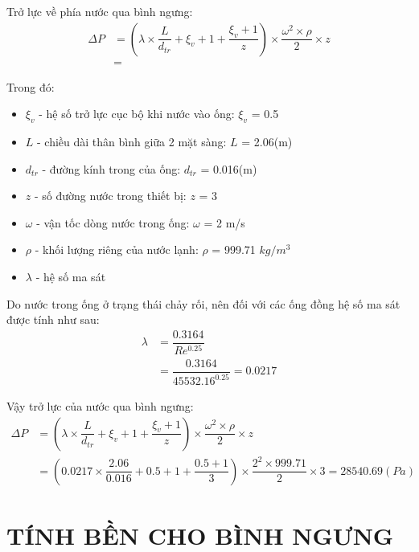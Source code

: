 Trở lực về phía nước qua bình ngưng:
\begin{equation*}
	\begin{split}
		\Delta P &= \left(\lambda\times\dfrac{L}{d_{tr}} +\xi_{v} + 1 + \dfrac{\xi_{v} + 1}{z}\right)\times \dfrac{\omega^2\times\rho}{2}\times z\\
		&=  
	\end{split}
\end{equation*}

Trong đó:
\begin{itemize}
	\item $\xi_{v}$ - hệ số trở lực cục bộ khi nước vào ống: $\xi_{v}$ = 0.5
	\item $L$ - chiều dài thân bình giữa 2 mặt sàng: $L$ = 2.06(m)
	\item $d_{tr}$ - đường kính trong của ống: $d_{tr}$ = 0.016(m)
	\item $z$ - số đường nước trong thiết bị: $z$ = 3
	\item $\omega$ - vận tốc dòng nước trong ống: $\omega$ = 2 m/s
	\item $\rho$ - khối lượng riêng của nước lạnh: $\rho$ = 999.71 $kg/m^3$
	\item $\lambda$ - hệ số ma sát	
\end{itemize}

Do nước trong ống ở trạng thái chảy rối, nên đối với các ống đồng hệ số ma sát được tính như sau:
\begin{equation*}
	\begin{split}
		\lambda &= \dfrac{0.3164}{Re^{0.25}}\\
		&=  \dfrac{0.3164}{45532.16^{0.25}}=0.0217
	\end{split}
\end{equation*}

Vậy trở lực của nước qua bình ngưng:
\begin{equation*}
	\begin{split}
		\Delta P &= \left(\lambda\times\dfrac{L}{d_{tr}} +\xi_{v} + 1 + \dfrac{\xi_{v} + 1}{z}\right)\times \dfrac{\omega^2\times\rho}{2}\times z\\
		&=  (0.0217 \times \dfrac{2.06}{0.016} + 0.5 + 1 + \dfrac{0.5+1}{3}) \times \dfrac{2^2 \times 999.71}{2} \times 3 = 28540.69(Pa)
	\end{split}
\end{equation*}

\section{TÍNH BỀN CHO BÌNH NGƯNG}
